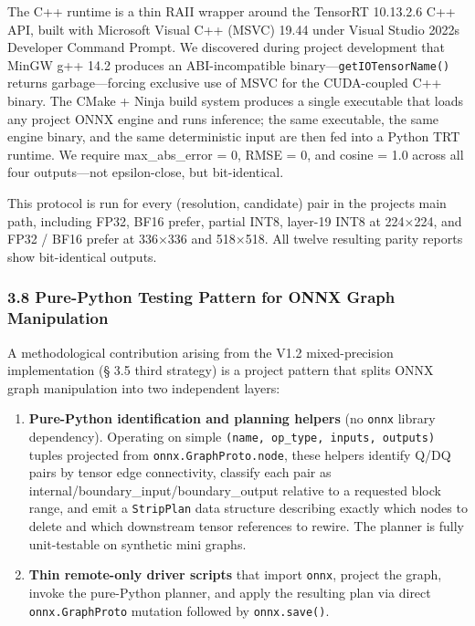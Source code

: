 \documentclass[
]{article}
\begin{document}
The C++ runtime is a thin RAII wrapper around the TensorRT 10.13.2.6 C++
API, built with Microsoft Visual C++ (MSVC) 19.44 under Visual Studio
2022\textquotesingle s Developer Command Prompt. We discovered during
project development that MinGW g++ 14.2 produces an ABI-incompatible
binary---\texttt{getIOTensorName()} returns garbage---forcing exclusive
use of MSVC for the CUDA-coupled C++ binary. The CMake + Ninja build
system produces a single executable that loads any project ONNX engine
and runs inference; the same executable, the same engine binary, and the
same deterministic input are then fed into a Python TRT runtime. We
require max\_abs\_error = 0, RMSE = 0, and cosine = 1.0 across all four
outputs---not epsilon-close, but bit-identical.

This protocol is run for every (resolution, candidate) pair in the
project\textquotesingle s main path, including FP32, BF16 prefer,
partial INT8, layer-19 INT8 at 224×224, and FP32 / BF16 prefer at
336×336 and 518×518. All twelve resulting parity reports show
bit-identical outputs.

\subsubsection{3.8 Pure-Python Testing Pattern for ONNX Graph
Manipulation}\label{38-pure-python-testing-pattern-for-onnx-graph-manipulation}

A methodological contribution arising from the V1.2 mixed-precision
implementation (§ 3.5 third strategy) is a project pattern that splits
ONNX graph manipulation into two independent layers:

\begin{enumerate}
\def\labelenumi{\arabic{enumi}.}
\item
  \textbf{Pure-Python identification and planning helpers} (no
  \texttt{onnx} library dependency). Operating on simple
  \texttt{(name,\ op\_type,\ inputs,\ outputs)} tuples projected from
  \texttt{onnx.GraphProto.node}, these helpers identify Q/DQ pairs by
  tensor edge connectivity, classify each pair as
  internal/boundary\_input/boundary\_output relative to a requested
  block range, and emit a \texttt{StripPlan} data structure describing
  exactly which nodes to delete and which downstream tensor references
  to rewire. The planner is fully unit-testable on synthetic mini
  graphs.
\item
  \textbf{Thin remote-only driver scripts} that import \texttt{onnx},
  project the graph, invoke the pure-Python planner, and apply the
  resulting plan via direct \texttt{onnx.GraphProto} mutation followed
  by \texttt{onnx.save()}.
\end{enumerate}
\end{document}
